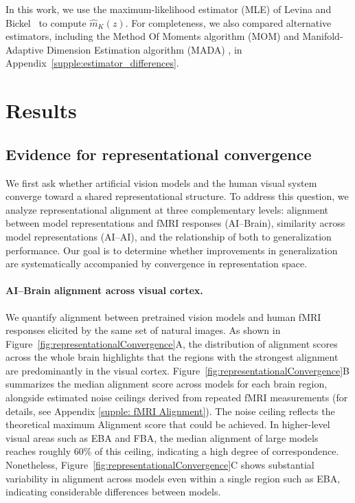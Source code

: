 \documentclass{article}
\theoremstyle{plain}
\theoremstyle{definition}
\theoremstyle{remark}
\begin{document}
In this work, we use the maximum-likelihood estimator (MLE) of Levina and Bickel~\citep{levina2004maximum} to compute \(\hat m_K(z)\). For completeness, we also compared alternative estimators, including the Method Of Moments algorithm (MOM) \citep{amsaleg2018extreme} and Manifold-Adaptive Dimension Estimation algorithm (MADA) \citep{farahmand2007manifold}, in Appendix~\ref{supple:estimator_differences}.


\section{Results}



\subsection{Evidence for representational convergence}
\label{ssec:alignment_convergence}


We first ask whether artificial vision models and the human visual system converge toward a shared representational structure.
To address this question, we analyze representational alignment at three complementary levels: alignment between model representations and fMRI responses (AI--Brain), similarity across model representations (AI--AI), and the relationship of both to generalization performance.
Our goal is to determine whether improvements in generalization are systematically accompanied by convergence in representation space.


\paragraph{AI--Brain alignment across visual cortex.}
We quantify alignment between pretrained vision models and human fMRI responses elicited by the same set of natural images.
As shown in Figure~\ref{fig:representationalConvergence}A, the distribution of alignment scores across the whole brain highlights that the regions with the strongest alignment are predominantly in the visual cortex.
Figure~\ref{fig:representationalConvergence}B summarizes the median alignment score across models for each brain region, alongside estimated noise ceilings derived from repeated fMRI measurements (for details, see Appendix \ref{supple: fMRI Alignment}). The noise ceiling reflects the theoretical maximum Alignment score that could be achieved. In higher-level visual areas such as EBA and FBA, the median alignment of large models reaches roughly 60\% of this ceiling, indicating a high degree of correspondence.
Nonetheless, Figure~\ref{fig:representationalConvergence}C shows substantial variability in alignment across models even within a single region such as EBA, indicating considerable differences between models.
\end{document}

